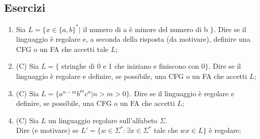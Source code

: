 \documentclass[a4paper,11pt]{article}
\begin{document}
\subsection{Esercizi}
\begin{enumerate}
    \item Sia $L=\{x\in\{a,b\}^{*}|$ il numero di a è minore del numero di b $\}$. Dire se il linguaggio è regolare e, a seconda della risposta (da motivare), definire una CFG o un FA che accetti tale $L$;
    \item (C) Sia $L=\{$ stringhe di 0 e 1 che iniziano e finiscono con 0$\}$. Dire se il linguaggio è regolare e definire, se possibile, una CFG o un FA che accetti $L$;
    \item (C) Sia $L=\{a^{n-m}b^mc^n|n>m>0\}$. Dire se il linguaggio è regolare e definire, se possibile, una CFG o un FA che accetti $L$;
    \item (C) Sia $L$ un linguaggio regolare sull'alfabeto $\Sigma$.\\Dire (e motivare) se $L'=\{w\in \Sigma ^{*} : \exists x\in \Sigma ^{*}$ tale che $wx \in L\}$ è regolare;
\end{enumerate}
\end{document}
